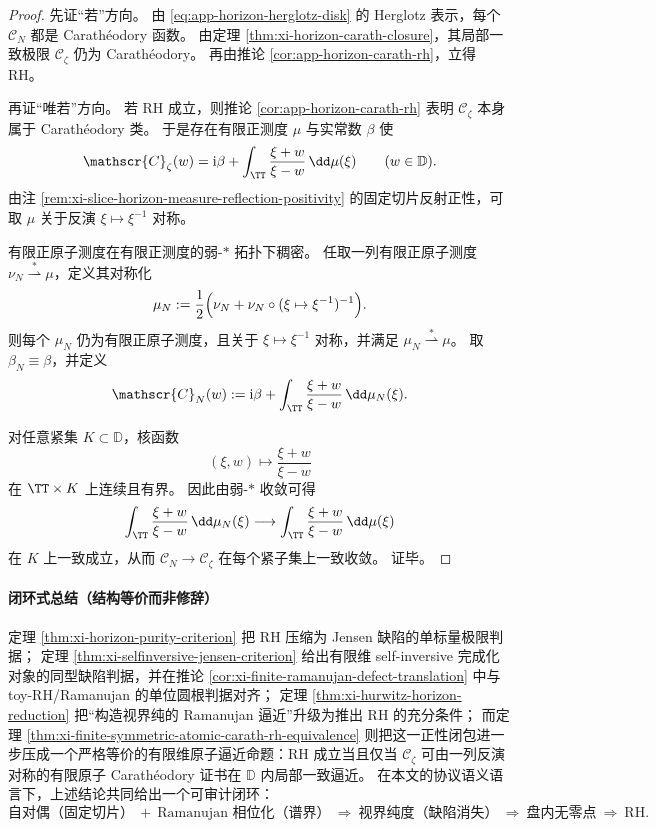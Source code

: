 \begin{proof}
先证“若”方向。
由 \eqref{eq:app-horizon-herglotz-disk} 的 Herglotz 表示，每个 \(\mathscr{C}_N\) 都是 Carath\'eodory 函数。
由定理 \ref{thm:xi-horizon-carath-closure}，其局部一致极限 \(\mathscr{C}_{\zeta}\) 仍为 Carath\'eodory。
再由推论 \ref{cor:app-horizon-carath-rh}，立得 RH。

再证“唯若”方向。
若 RH 成立，则推论 \ref{cor:app-horizon-carath-rh} 表明 \(\mathscr{C}_{\zeta}\) 本身属于 Carath\'eodory 类。
于是存在有限正测度 \(\mu\) 与实常数 \(\beta\) 使
\[
\mathscr{C}_{\zeta}(w)
=
\mathrm{i}\beta+\int_{\TT}\frac{\xi+w}{\xi-w}\,\dd\mu(\xi)
\qquad(w\in\mathbb D).
\]
由注 \ref{rem:xi-slice-horizon-measure-reflection-positivity} 的固定切片反射正性，可取 \(\mu\) 关于反演 \(\xi\mapsto\xi^{-1}\) 对称。

有限正原子测度在有限正测度的弱-\(\ast\) 拓扑下稠密。
任取一列有限正原子测度 \(\nu_N\overset{\ast}{\rightharpoonup}\mu\)，定义其对称化
\[
\mu_N
:=
\frac12\Bigl(\nu_N+\nu_N\circ(\xi\mapsto\xi^{-1})^{-1}\Bigr).
\]
则每个 \(\mu_N\) 仍为有限正原子测度，且关于 \(\xi\mapsto\xi^{-1}\) 对称，并满足 \(\mu_N\overset{\ast}{\rightharpoonup}\mu\)。
取 \(\beta_N\equiv\beta\)，并定义
\[
\mathscr{C}_N(w)
:=
\mathrm{i}\beta+\int_{\TT}\frac{\xi+w}{\xi-w}\,\dd\mu_N(\xi).
\]

对任意紧集 \(K\subset\mathbb D\)，核函数
\[
(\xi,w)\longmapsto\frac{\xi+w}{\xi-w}
\]
在 \(\TT\times K\) 上连续且有界。
因此由弱-\(\ast\) 收敛可得
\[
\int_{\TT}\frac{\xi+w}{\xi-w}\,\dd\mu_N(\xi)
\longrightarrow
\int_{\TT}\frac{\xi+w}{\xi-w}\,\dd\mu(\xi)
\]
在 \(K\) 上一致成立，从而 \(\mathscr{C}_N\to \mathscr{C}_{\zeta}\) 在每个紧子集上一致收敛。
证毕。
\end{proof}

\paragraph{闭环式总结（结构等价而非修辞）}
定理 \ref{thm:xi-horizon-purity-criterion} 把 RH 压缩为 Jensen 缺陷的单标量极限判据；
定理 \ref{thm:xi-selfinversive-jensen-criterion} 给出有限维 self-inversive 完成化对象的同型缺陷判据，并在推论 \ref{cor:xi-finite-ramanujan-defect-translation} 中与 toy-RH/Ramanujan 的单位圆根判据对齐；
定理 \ref{thm:xi-hurwitz-horizon-reduction} 把“构造视界纯的 Ramanujan 逼近”升级为推出 RH 的充分条件；
而定理 \ref{thm:xi-finite-symmetric-atomic-carath-rh-equivalence} 则把这一正性闭包进一步压成一个严格等价的有限维原子逼近命题：RH 成立当且仅当 \(\mathscr{C}_{\zeta}\) 可由一列反演对称的有限原子 Carath\'eodory 证书在 \(\mathbb{D}\) 内局部一致逼近。
在本文的协议语义语言下，上述结论共同给出一个可审计闭环：
\[
\text{自对偶（固定切片）}\ +\ \text{Ramanujan 相位化（谱界）}
\ \Longrightarrow\ 
\text{视界纯度（缺陷消失）}
\ \Longrightarrow\ 
\text{盘内无零点}
\ \Longrightarrow\ 
\text{RH}.
\]
\endinput
